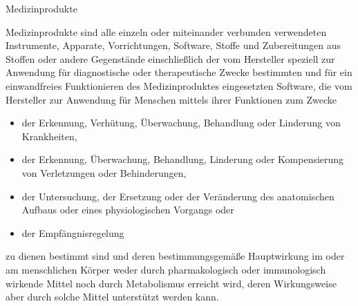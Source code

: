 \begin{frame}{Medizinprodukte}
    \footnotesize{
        Medizinprodukte sind alle einzeln oder miteinander verbunden verwendeten Instrumente, Apparate, Vorrichtungen, Software, Stoffe und Zubereitungen aus Stoffen oder andere Gegenstände einschließlich der vom Hersteller speziell zur Anwendung für diagnostische oder therapeutische Zwecke bestimmten und für ein einwandfreies Funktionieren des Medizinproduktes eingesetzten Software, die vom Hersteller zur Anwendung für Menschen mittels ihrer Funktionen zum Zwecke
        \begin{itemize}
            \item der Erkennung, Verhütung, Überwachung, Behandlung oder Linderung von Krankheiten,
            \item der Erkennung, Überwachung, Behandlung, Linderung oder Kompensierung von Verletzungen oder Behinderungen,
            \item der Untersuchung, der Ersetzung oder der Veränderung des anatomischen Aufbaus oder eines physiologischen Vorgangs oder
            \item der Empfängnisregelung
        \end{itemize}
        zu dienen bestimmt sind und deren bestimmungsgemäße Hauptwirkung im oder am menschlichen Körper weder durch pharmakologisch oder immunologisch wirkende Mittel noch durch Metabolismus erreicht wird, deren Wirkungsweise aber durch solche Mittel unterstützt werden kann.
    }
\end{frame}

